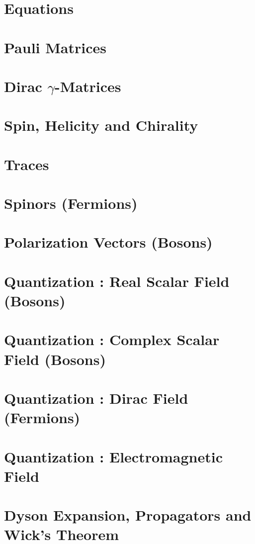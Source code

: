 \documentclass[landscape,8pt,a4paper,english]{extarticle}
\begin{document}
\begin{multicols*}{3}\centering
        \section*{Equations}
        \section*{Pauli Matrices}
        \section*{Dirac $\gamma$-Matrices}
        \section*{Spin, Helicity and Chirality}
        \section*{Traces}
        \section*{Spinors (Fermions)}
        \section*{Polarization Vectors (Bosons)}
        \section*{Quantization : Real Scalar Field (Bosons)}
        \section*{Quantization : Complex Scalar Field (Bosons)}
        \section*{Quantization : Dirac Field (Fermions)}
        \section*{Quantization : Electromagnetic Field}
        \section*{Dyson Expansion, Propagators and Wick's Theorem}

\end{multicols*}
\end{document}
